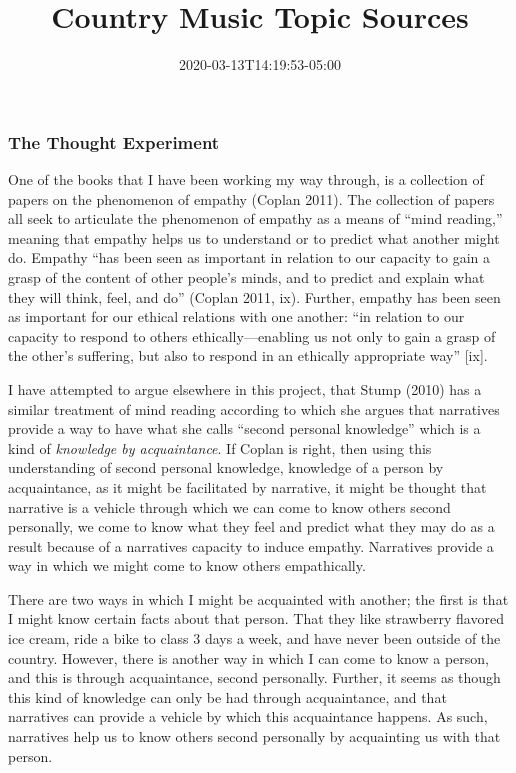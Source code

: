 \documentclass[]{article}
\title{Country Music Topic Sources}
\author{}
\date{\vspace{-2.5em}2020-03-13T14:19:53-05:00}
\begin{document}
\maketitle

\hypertarget{the-thought-experiment}{%
\subsubsection{The Thought Experiment}\label{the-thought-experiment}}

One of the books that I have been working my way through, is a
collection of papers on the phenomenon of empathy (Coplan 2011). The
collection of papers all seek to articulate the phenomenon of empathy as
a means of ``mind reading,'' meaning that empathy helps us to understand
or to predict what another might do. Empathy ``has been seen as
important in relation to our capacity to gain a grasp of the content of
other people's minds, and to predict and explain what they will think,
feel, and do'' (Coplan 2011, ix). Further, empathy has been seen as
important for our ethical relations with one another: ``in relation to
our capacity to respond to others ethically---enabling us not only to
gain a grasp of the other's suffering, but also to respond in an
ethically appropriate way'' {[}ix{]}.

I have attempted to argue elsewhere in this project, that Stump (2010)
has a similar treatment of mind reading according to which she argues
that narratives provide a way to have what she calls ``second personal
knowledge'' which is a kind of \emph{knowledge by acquaintance}. If
Coplan is right, then using this understanding of second personal
knowledge, knowledge of a person by acquaintance, as it might be
facilitated by narrative, it might be thought that narrative is a
vehicle through which we can come to know others second personally, we
come to know what they feel and predict what they may do as a result
because of a narratives capacity to induce empathy. Narratives provide a
way in which we might come to know others empathically.

There are two ways in which I might be acquainted with another; the
first is that I might know certain facts about that person. That they
like strawberry flavored ice cream, ride a bike to class 3 days a week,
and have never been outside of the country. However, there is another
way in which I can come to know a person, and this is through
acquaintance, second personally. Further, it seems as though this kind
of knowledge can only be had through acquaintance, and that narratives
can provide a vehicle by which this acquaintance happens. As such,
narratives help us to know others second personally by acquainting us
with that person.
\end{document}

